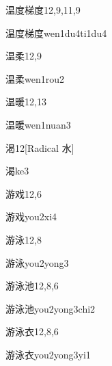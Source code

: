 \begin{entry}{温度梯度}{12,9,11,9}
  \begin{phonetics}{温度梯度}{wen1du4ti1du4}
  \end{phonetics}
\end{entry}

\begin{entry}{温柔}{12,9}
  \begin{phonetics}{温柔}{wen1rou2}
  \end{phonetics}
\end{entry}

\begin{entry}{温暖}{12,13}
  \begin{phonetics}{温暖}{wen1nuan3}
  \end{phonetics}
\end{entry}

\begin{entry}{渴}{12}[Radical 水]
  \begin{phonetics}{渴}{ke3}
  \end{phonetics}
\end{entry}

\begin{entry}{游戏}{12,6}
  \begin{phonetics}{游戏}{you2xi4}
  \end{phonetics}
\end{entry}

\begin{entry}{游泳}{12,8}
  \begin{phonetics}{游泳}{you2yong3}
  \end{phonetics}
\end{entry}

\begin{entry}{游泳池}{12,8,6}
  \begin{phonetics}{游泳池}{you2yong3chi2}
  \end{phonetics}
\end{entry}

\begin{entry}{游泳衣}{12,8,6}
  \begin{phonetics}{游泳衣}{you2yong3yi1}
  \end{phonetics}
\end{entry}

